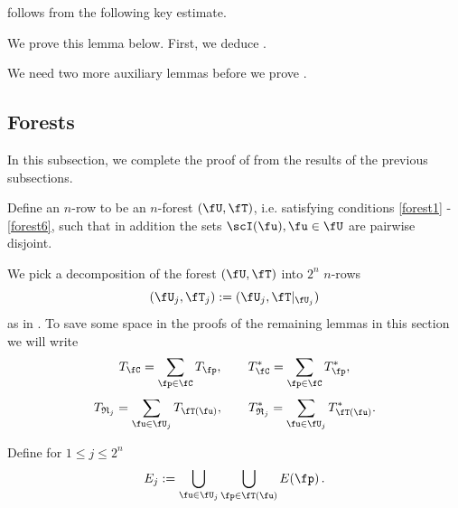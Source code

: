     

     follows from the following key estimate.


    We prove this lemma below. First, we deduce .

    

    We need two more auxiliary lemmas before we prove .


    


    






\subsection{Forests}
In this subsection, we complete the proof of  from the results of the previous subsections.

Define an $n$-row to be an $n$-forest $(\fU, \fT)$, i.e. satisfying conditions \eqref{forest1} - \eqref{forest6}, such that in addition the sets $\scI(\fu), \fu \in \fU$ are pairwise disjoint.




We pick a decomposition of the forest $(\fU, \fT)$ into $2^n$ $n$-rows
\begin{equation*}
(\fU_j, \fT_j) := (\fU_j, \fT|_{\fU_j})
\end{equation*}
as in . To save some space in the proofs of the remaining lemmas in this section we will write
    $$
        T_{\fC} = \sum_{\fp \in \fC} T_{\fp},\qquad T_{\fC}^* = \sum_{\fp \in \fC} T_{\fp}^*,
    $$
    $$
        T_{\mathfrak{R}_j} = \sum_{\fu \in \fU_j} T_{\fT(\fu)},\qquad T_{\mathfrak{R}_j}^* = \sum_{\fu \in \fU_j} T_{\fT(\fu)}^*.
    $$






Define for $1 \le j \le 2^n$
$$
    E_j := \bigcup_{\fu \in \fU_j} \bigcup_{\fp \in \fT(\fu)} E(\fp)\,.
$$




